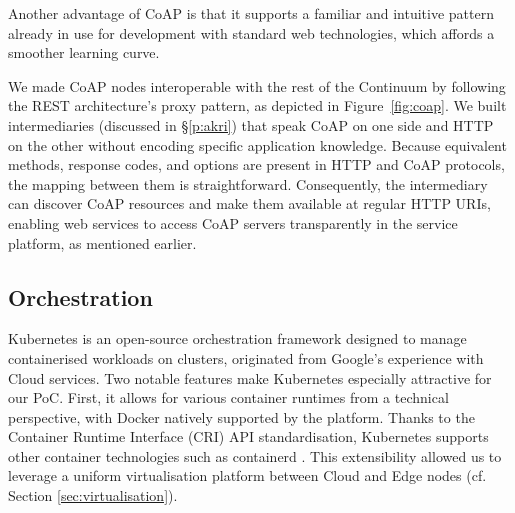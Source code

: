 Another advantage of CoAP is that it supports a familiar and intuitive pattern already in use for development with standard web technologies, which affords a smoother learning curve. 

We made CoAP nodes interoperable with the rest of the Continuum by following the REST architecture's proxy pattern, as depicted in Figure~\ref{fig:coap}. We built intermediaries (discussed in §\ref{p:akri}) that speak CoAP on one side and HTTP on the other without encoding specific application knowledge. Because equivalent methods, response codes, and options are present in HTTP and CoAP protocols, the mapping between them is straightforward. Consequently, the intermediary can discover CoAP resources and make them available at regular HTTP URIs, enabling web services to access CoAP servers transparently in the service platform, as mentioned earlier.


\subsection{Orchestration}

Kubernetes \cite{kubernetes} is an open-source orchestration framework designed to manage containerised workloads on clusters, originated from Google's experience with Cloud services. Two notable features make Kubernetes especially attractive for our PoC. 
First, it allows for various container runtimes from a technical perspective, with Docker natively supported by the platform. Thanks to the Container Runtime Interface (CRI) API standardisation, Kubernetes supports other container technologies such as containerd \cite{containerd}. This extensibility allowed us to leverage a uniform virtualisation platform between Cloud and Edge nodes (cf. Section \ref{sec:virtualisation}).

